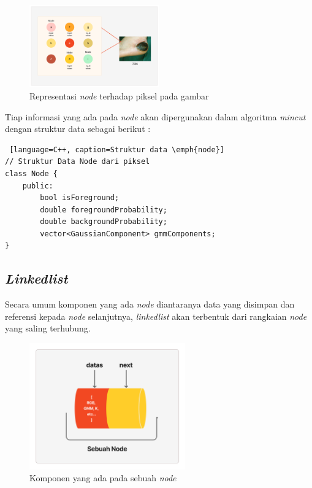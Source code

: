 \begin{figure}[H]
	\centering{}
	\includegraphics[width=0.5\textwidth]{gambar/node_representasi.png}
	\caption{Representasi \emph{node} terhadap piksel pada gambar}
\end{figure}

Tiap informasi yang ada pada \emph{node} akan dipergunakan dalam algoritma \emph{mincut}
dengan struktur data sebagai berikut :

\begin{lstlisting} [language=C++, caption=Struktur data \emph{node}]
// Struktur Data Node dari piksel
class Node {
    public:
        bool isForeground;
        double foregroundProbability;
        double backgroundProbability;
        vector<GaussianComponent> gmmComponents;
}  
\end{lstlisting}

\subsection{\emph{Linkedlist}} 
Secara umum komponen yang ada \emph{node} diantaranya data yang disimpan dan 
referensi kepada \emph{node} selanjutnya, \emph{linkedlist} akan terbentuk 
dari rangkaian \emph{node} yang saling terhubung.

\begin{figure}[H]
	\centering{}
	\includegraphics[width=0.6\textwidth]{gambar/node_komponen.png}
	\caption{Komponen yang ada pada sebuah \emph{node}}
\end{figure}

